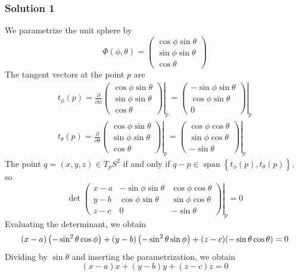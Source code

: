 \documentclass[12pt, t]{beamer}
\begin{document}
\begin{frame}[allowframebreaks]
    \frametitle{Solution 1}
    We parametrize the unit sphere by
    \[
        \Phi(\phi, \theta)=\left(\begin{array}{c}
                \cos \phi \sin \theta \\
                \sin \phi \sin \theta \\
                \cos \theta
            \end{array}\right)
    \]
    The tangent vectors at the point $p$ are
    \[
        \begin{array}{l}
            t_{\phi}(p)=\left.\frac{\partial}{\partial \phi}\left(\begin{array}{c}
                    \cos \phi \sin \theta \\
                    \sin \phi \sin \theta \\
                    \cos \theta
                \end{array}\right)\right|_{p}=\left.\left(\begin{array}{c}
                    -\sin \phi \sin \theta \\
                    \cos \phi \sin \theta  \\
                    0
                \end{array}\right)\right|_{p} \\
            t_{\theta}(p)=\left.\frac{\partial}{\partial \theta}\left(\begin{array}{c}
                    \cos \phi \sin \theta \\
                    \sin \phi \sin \theta \\
                    \cos \theta
                \end{array}\right)\right|_{p}=\left.\left(\begin{array}{c}
                    \cos \phi \cos \theta \\
                    \sin \phi \cos \theta \\
                    -\sin \theta
                \end{array}\right)\right|_{p}
        \end{array}
    \]
    The point $q=(x, y, z) \in T_{p} S^{2}$ if and only if $q-p \in \operatorname{span}\left\{t_{\phi}(p), t_{\theta}(p)\right\},$ so
    \[
        \left.\operatorname{det}\left(\begin{array}{ccc}
                x-a & -\sin \phi \sin \theta & \cos \phi \cos \theta \\
                y-b & \cos \phi \sin \theta  & \sin \phi \cos \theta \\
                z-c & 0                      & -\sin \theta
            \end{array}\right)\right|_{p}=0
    \]
    Evaluating the determinant, we obtain
    \[
        \footnotesize
        (x-a)\left(-\sin ^{2} \theta \cos \phi\right)+(y-b)\left(-\sin ^{2} \theta \sin \phi\right)+(z-c)(-\sin \theta \cos \theta)=0
    \]
    Dividing by $\sin \theta$ and inserting the parametrization, we obtain
    \[
        (x-a) x+(y-b) y+(z-c) z=0
    \]


\end{frame}
\end{document}
